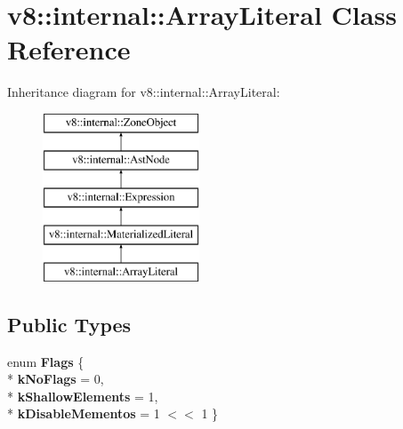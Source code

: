 \hypertarget{classv8_1_1internal_1_1_array_literal}{}\section{v8\+:\+:internal\+:\+:Array\+Literal Class Reference}
\label{classv8_1_1internal_1_1_array_literal}
Inheritance diagram for v8\+:\+:internal\+:\+:Array\+Literal\+:\begin{figure}[H]
\begin{center}
\leavevmode
\includegraphics[height=5.000000cm]{classv8_1_1internal_1_1_array_literal}
\end{center}
\end{figure}
\subsection*{Public Types}
\begin{DoxyCompactItemize}
\item 
enum {\bfseries Flags} \{ \\*
{\bfseries k\+No\+Flags} = 0, 
\\*
{\bfseries k\+Shallow\+Elements} = 1, 
\\*
{\bfseries k\+Disable\+Mementos} = 1 $<$$<$ 1
 \}\hypertarget{classv8_1_1internal_1_1_array_literal_a6b34203716549cca6f3b51d99e32aecd}{}\label{classv8_1_1internal_1_1_array_literal_a6b34203716549cca6f3b51d99e32aecd}

\end{DoxyCompactItemize}
